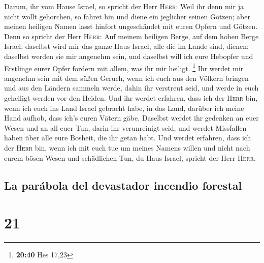  Darum, ihr vom Hause Israel, so spricht der Herr
\textsc{Herr}: Weil ihr denn mir ja nicht wollt gehorchen, so fahret hin
und diene ein jeglicher seinen Götzen; aber meinen heiligen Namen lasst
hinfort ungeschändet mit euren Opfern und Götzen.  Denn
so spricht der Herr \textsc{Herr}: Auf meinem heiligen Berge, auf dem
hohen Berge Israel, daselbst wird mir das ganze Haus Israel, alle die im
Lande sind, dienen; daselbst werden sie mir angenehm sein, und daselbst
will ich eure Hebopfer und Erstlinge eurer Opfer fordern mit allem, was
ihr mir heiligt. \footnote{\textbf{20:40} Hes 17,23}  Ihr
werdet mir angenehm sein mit dem süßen Geruch, wenn ich euch aus den
Völkern bringen und aus den Ländern sammeln werde, dahin ihr verstreut
seid, und werde in euch geheiligt werden vor den Heiden. 
Und ihr werdet erfahren, dass ich der \textsc{Herr} bin, wenn ich euch
ins Land Israel gebracht habe, in das Land, darüber ich meine Hand
aufhob, dass ich's euren Vätern gäbe.  Daselbst werdet
ihr gedenken an euer Wesen und an all euer Tun, darin ihr verunreinigt
seid, und werdet Missfallen haben über alle eure Bosheit, die ihr getan
habt.  Und werdet erfahren, dass ich der \textsc{Herr}
bin, wenn ich mit euch tue um meines Namens willen und nicht nach eurem
bösen Wesen und schädlichen Tun, du Haus Israel, spricht der Herr
\textsc{Herr}.

\hypertarget{la-paruxe1bola-del-devastador-incendio-forestal}{%
\subsection{La parábola del devastador incendio
forestal}\label{la-paruxe1bola-del-devastador-incendio-forestal}}

\hypertarget{section-20}{%
\section{21}\label{section-20}}

